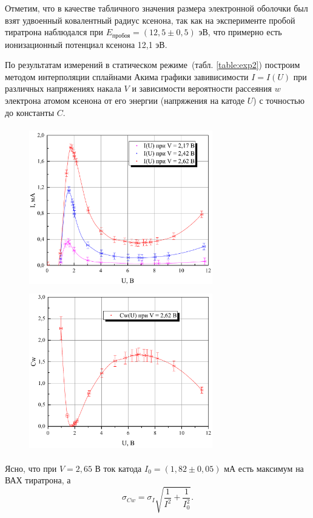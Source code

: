 \documentclass[a4paper,12pt]{article} %
\begin{document}
		Отметим, что в качестве табличного значения размера электронной оболочки был взят удвоенный ковалентный радиус ксенона, так как на эксперименте пробой тиратрона наблюдался при $E_\text{пробоя} = (12,5 \pm 0,5)$ эВ, что примерно есть ионизационный потенциал ксенона 12,1 эВ.
		
		По результатам измерений в статическом режиме~(табл. \ref{table:exp2}) построим методом интерполяции сплайнами Акима графики завивисимости $I = I(U)$ при различных напряжениях накала $V$ и зависимости вероятности рассеяния $w$ электрона атомом ксенона от его энергии (напряжения на катоде $U$) с точностью до константы $C$.
		\begin{figure}[h!]
			\begin{floatrow}
				{\includegraphics[width=8cm,height=7cm]{graph1.pdf}}
				{\includegraphics[width=8cm,height=7cm]{graph2.pdf}}     
			\end{floatrow}
		\end{figure}
	
		Ясно, что при $V = 2,65$ В ток катода $I_0 =(1,82 \pm 0,05)$ мА есть максимум на ВАХ тиратрона, а 
		\begin{equation*}
			\sigma_{Cw} = \sigma_I \sqrt{\frac{1}{I^2} + \frac{1}{I_0^2}}.
		\end{equation*}
		
\end{document}
